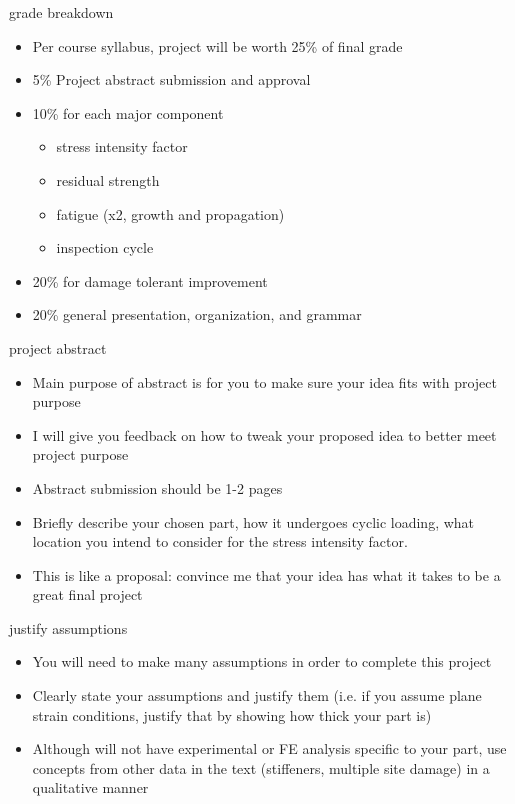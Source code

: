 \documentclass[10pt]{beamer}
\begin{document}
\begin{frame}{grade breakdown}
	\begin{itemize}[<+->]
		\item Per course syllabus, project will be worth 25\% of final grade
		\item 5\% Project abstract submission and approval
		\item 10\% for each major component
		\begin{itemize}
			\item stress intensity factor
			\item residual strength
			\item fatigue (x2, growth and propagation)
			\item inspection cycle
		\end{itemize}
		\item 20\% for damage tolerant improvement
		\item 20\% general presentation, organization, and grammar
	\end{itemize}
\end{frame}

\begin{frame}{project abstract}
	\begin{itemize}[<+->]
		\item Main purpose of abstract is for you to make sure your idea fits with project purpose
		\item I will give you feedback on how to tweak your proposed idea to better meet project purpose
		\item Abstract submission should be 1-2 pages
		\item Briefly describe your chosen part, how it undergoes cyclic loading, what location you intend to consider for the stress intensity factor.
		\item This is like a proposal: convince me that your idea has what it takes to be a great final project
	\end{itemize}
\end{frame}

\begin{frame}{justify assumptions}
	\begin{itemize}[<+->]
		\item You will need to make many assumptions in order to complete this project
		\item Clearly state your assumptions and justify them (i.e. if you assume plane strain conditions, justify that by showing how thick your part is)
		\item Although will not have experimental or FE analysis specific to your part, use concepts from other data in the text (stiffeners, multiple site damage) in a qualitative manner
	\end{itemize}
\end{frame}
\end{document}
